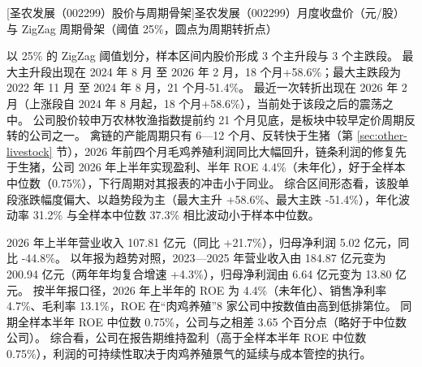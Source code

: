 \begin{center}
\begin{minipage}{\textwidth}\centering
{}

[圣农发展（002299）股价与周期骨架]{圣农发展（002299）月度收盘价（元/股）与 ZigZag 周期骨架（阈值 25\%，圆点为周期转折点）}
\end{minipage}
\end{center}

 以 25\% 的 ZigZag 阈值划分，样本区间内股价形成 3 个主升段与 3 个主跌段。 最大主升段出现在 2024 年 8 月 至 2026 年 2 月，18 个月+58.6\%；最大主跌段为 2022 年 11 月 至 2024 年 8 月，21 个月-51.4\%。 最近一次转折出现在 2026 年 2 月（上涨段自 2024 年 8 月起，18 个月+58.6\%），当前处于该段之后的震荡之中。 公司股价较申万农林牧渔指数提前约 21 个月见底，是板块中较早定价周期反转的公司之一。 禽链的产能周期只有 6---12 个月、反转快于生猪（第 \ref{sec:other-livestock} 节），2026 年前四个月毛鸡养殖利润同比大幅回升，链条利润的修复先于生猪，公司 2026 年上半年实现盈利、半年 ROE 4.4\%（未年化），好于全样本中位数（0.75\%），下行周期对其报表的冲击小于同业。 综合区间形态看，该股单段涨跌幅度偏大、以趋势段为主（最大主升 +58.6\%、最大主跌 -51.4\%），年化波动率 31.2\% 与全样本中位数 37.3\% 相比波动小于样本中位数。

 2026 年上半年营业收入 107.81 亿元（同比 +21.7\%），归母净利润 5.02 亿元，同比 -44.8\%。 以年报为趋势对照，2023---2025 年营业收入由 184.87 亿元变为 200.94 亿元（两年年均复合增速 +4.3\%），归母净利润由 6.64 亿元变为 13.80 亿元。 按半年报口径，2026 年上半年的 ROE 为 4.4\%（未年化）、销售净利率 4.7\%、毛利率 13.1\%，ROE 在“肉鸡养殖”8 家公司中按数值由高到低排第位。 同期全样本半年 ROE 中位数 0.75\%，公司与之相差 3.65 个百分点（略好于中位数公司）。 综合看，公司在报告期维持盈利（高于全样本半年 ROE 中位数 0.75\%），利润的可持续性取决于肉鸡养殖景气的延续与成本管控的执行。

